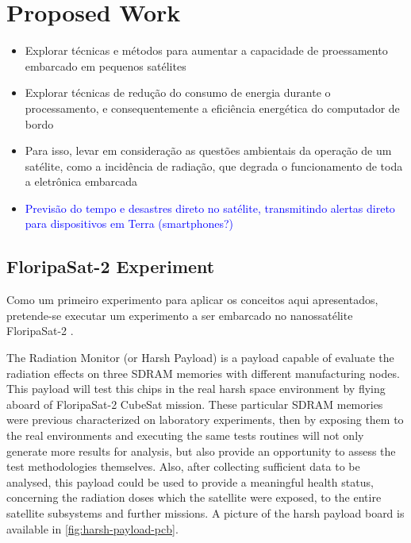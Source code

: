 %
%
%
%
%

%
%
%
%
%

\section{Proposed Work} \label{sec:proposed-work}

\begin{itemize}
    \item Explorar técnicas e métodos para aumentar a capacidade de proessamento embarcado em pequenos satélites
    \item Explorar técnicas de redução do consumo de energia durante o processamento, e consequentemente a eficiência energética do computador de bordo
    \item Para isso, levar em consideração as questões ambientais da operação de um satélite, como a incidência de radiação, que degrada o funcionamento de toda a eletrônica embarcada
    \item \textcolor{blue}{Previsão do tempo e desastres direto no satélite, transmitindo alertas direto para dispositivos em Terra (smartphones?)}
\end{itemize}

\subsection{FloripaSat-2 Experiment}

Como um primeiro experimento para aplicar os conceitos aqui apresentados, pretende-se executar um experimento a ser embarcado no nanossatélite FloripaSat-2 \cite{floripasat2}.

The Radiation Monitor (or Harsh Payload) is a payload capable of evaluate the radiation effects on three SDRAM memories with different manufacturing nodes. This payload will test this chips in the real harsh space environment by flying aboard of FloripaSat-2 CubeSat mission. These particular SDRAM memories were previous characterized on laboratory experiments, then by exposing them to the real environments and executing the same tests routines will not only generate more results for analysis, but also provide an opportunity to assess the test methodologies themselves. Also, after collecting sufficient data to be analysed, this payload could be used to provide a meaningful health status, concerning the radiation doses which the satellite were exposed, to the entire satellite subsystems and further missions. A picture of the harsh payload board is available in \autoref{fig:harsh-payload-pcb}.

